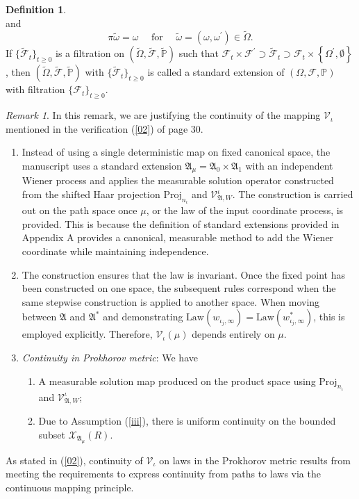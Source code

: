 \documentclass[english,a4paper,11pt]{amsart}
\theoremstyle{plain}
\theoremstyle{definition}
\newtheorem{definition}[theorem]{Definition}
\theoremstyle{remark}
\newtheorem{remark}[theorem]{Remark}
\renewcommand{\emph}[1]{{\sl #1}}
\numberwithin{equation}{section}
\renewcommand{\emph}[1]{{\sl #1}}
\begin{document}
\begin{appendix}
\begin{definition}
$$	$$
	and
	$$
	\pi \widetilde{\omega}=\omega \quad \text { for } \quad \widetilde{\omega}=\left(\omega, \omega^{\prime}\right) \in \widetilde{\Omega}.
	$$
	If $\{\widetilde{\mathscr{F}}_{t}\}_{t\ge 0}$ is a filtration  on $(\widetilde{\Omega}, \widetilde{\mathscr{F}}, \widetilde{\mathbb{P}})$ such that $\mathscr{F}_{t} \times \mathscr{F}^{\prime} \supset \widetilde{\mathscr{F}}_{t} \supset \mathscr{F}_{t} \times\left\{\Omega^{\prime}, \emptyset\right\}$, then $(\widetilde{\Omega}, \widetilde{\mathscr{F}}, \widetilde{\mathbb{P}})$ with $\{\widetilde{\mathscr{F}}_{t}\}_{t\ge 0}$ is called a standard extension of $(\Omega, \mathscr{F}, \mathbb{P})$ with filtration $\{\mathscr{F}_t\}_{t\ge 0}$.
\end{definition}

{
\begin{remark}\label{Remcts}
	In this remark, we are justifying the continuity of the mapping $\mathscr{V}_\iota$ mentioned in the verification (\ref{02}) of page 30.
		\begin{enumerate}
			\item Instead of using a single deterministic map on fixed canonical space, the manuscript uses a standard extension $\mathfrak{A}_\mu=\mathfrak{A}_0\times \mathfrak{A}_1$ with an independent Wiener process and applies the measurable solution operator constructed from the shifted Haar projection $\mathrm{Proj}_{n_\iota}$ and $\mathcal{V}_{\mathfrak{A},W}^\iota$. The construction is carried out on the path space once $\mu$, or the law of the input coordinate process, is provided. This is because the definition of standard extensions provided in Appendix A provides a canonical, measurable method to add the Wiener coordinate while maintaining independence.
			
			\item The construction ensures that the law is invariant. Once the fixed point has been constructed on one space, the subsequent rules correspond when the same stepwise construction is applied to another space. When moving between $\mathfrak{A}$ and $\mathfrak{A}^\ast$ and demonstrating $\mathrm{Law}(w_{\iota_j,\infty})=\mathrm{Law}(w_{\iota_j,\infty}^\ast)$, this is employed explicitly. Therefore, $\mathscr{V}_{\iota}(\mu)$ depends entirely on $\mu$.
			
			\item	\emph{Continuity in Prokhorov metric}: We have 
			\begin{enumerate}
				\item 
				A measurable solution map produced on the product space using $\mathrm{Proj}_{n_\iota}$ and $\mathcal{V}_{\mathfrak{A},W}^{\iota}$; 
				\item Due to Assumption (\ref{iii}), there is uniform continuity on the bounded subset $\mathcal{X}_{\mathfrak{A}_\mu}(R)$. 
			\end{enumerate}
				\end{enumerate}
			As stated in (\ref{02}), continuity of $\mathscr{V}_{\iota}$ on laws in the Prokhorov metric results from meeting the requirements to express continuity from paths to laws via the continuous mapping principle. 
			\end{remark}
}

\end{appendix}
\end{document}
